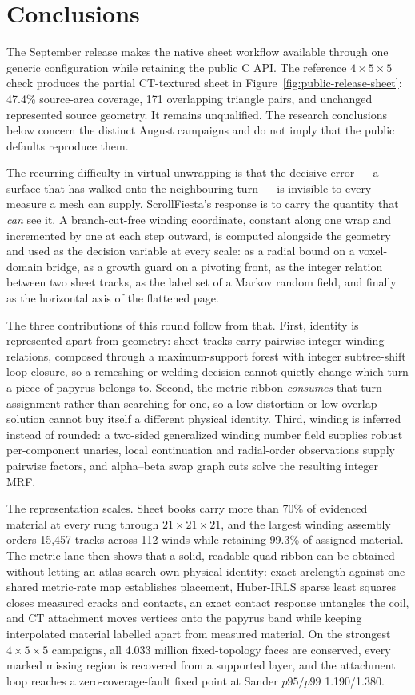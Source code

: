 \section{Conclusions}
\label{sec:conclusions}

The September release makes the native sheet workflow available through one
generic configuration while retaining the public C API. The reference
$4\times5\times5$ check produces the partial CT-textured sheet in
Figure~\ref{fig:public-release-sheet}: 47.4\% source-area coverage,
171 overlapping triangle pairs, and unchanged represented source geometry.
It remains unqualified. The research conclusions below concern the distinct
August campaigns and do not imply that the public defaults reproduce them.

The recurring difficulty in virtual unwrapping is that the decisive error --- a surface that has walked onto the neighbouring turn --- is invisible to every measure a mesh can supply. ScrollFiesta's response is to carry the quantity that \emph{can} see it. A branch-cut-free winding coordinate, constant along one wrap and incremented by one at each step outward, is computed alongside the geometry and used as the decision variable at every scale: as a radial bound on a voxel-domain bridge, as a growth guard on a pivoting front, as the integer relation between two sheet tracks, as the label set of a Markov random field, and finally as the horizontal axis of the flattened page.

The three contributions of this round follow from that. First, identity is represented apart from geometry: sheet tracks carry pairwise integer winding relations, composed through a maximum-support forest with integer subtree-shift loop closure, so a remeshing or welding decision cannot quietly change which turn a piece of papyrus belongs to. Second, the metric ribbon \emph{consumes} that turn assignment rather than searching for one, so a low-distortion or low-overlap solution cannot buy itself a different physical identity. Third, winding is inferred instead of rounded: a two-sided generalized winding number field supplies robust per-component unaries, local continuation and radial-order observations supply pairwise factors, and alpha--beta swap graph cuts solve the resulting integer MRF.

The representation scales. Sheet books carry more than 70\% of evidenced material at every rung through $21\times21\times21$, and the largest winding assembly orders 15,457 tracks across 112 winds while retaining 99.3\% of assigned material. The metric lane then shows that a solid, readable quad ribbon can be obtained without letting an atlas search own physical identity: exact arclength against one shared metric-rate map establishes placement, Huber-IRLS sparse least squares closes measured cracks and contacts, an exact contact response untangles the coil, and CT attachment moves vertices onto the papyrus band while keeping interpolated material labelled apart from measured material. On the strongest $4\times5\times5$ campaigns, all 4.033 million fixed-topology faces are conserved, every marked missing region is recovered from a supported layer, and the attachment loop reaches a zero-coverage-fault fixed point at Sander $p95/p99$ 1.190/1.380.

